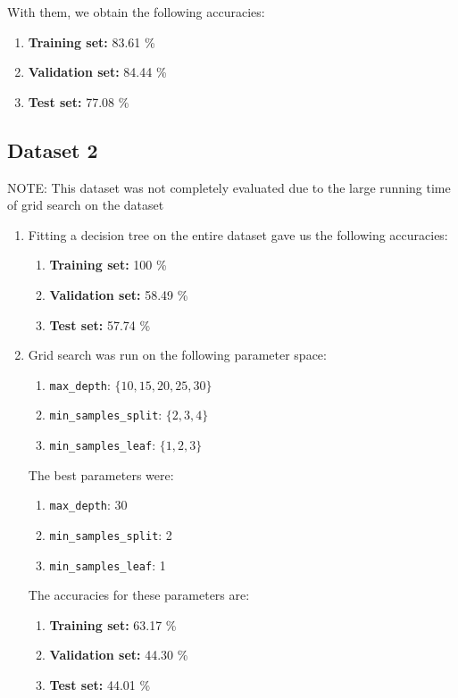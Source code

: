 \documentclass[12pt]{article}
\begin{document}
\begin{enumerate}[label=(\alph*)]
    With them, we obtain the following accuracies:
    \begin{enumerate}[label=(\roman*)]
        \item \textbf{Training set:} 83.61 \%
        \item \textbf{Validation set:} 84.44 \%
        \item \textbf{Test set:} 77.08 \%
    \end{enumerate}
\end{enumerate}

\subsection{Dataset 2}

NOTE: This dataset was not completely evaluated due to the large running time 
of grid search on the dataset

\begin{enumerate}[label=(\alph*)]
    \item Fitting a decision tree on the entire dataset gave us the following 
        accuracies:
    \begin{enumerate}[label=(\roman*)]
        \item \textbf{Training set:} 100 \%
        \item \textbf{Validation set:} 58.49 \%
        \item \textbf{Test set:} 57.74 \%
    \end{enumerate}

    \item Grid search was run on the following parameter space:
    \begin{enumerate}[label=(\roman*)]
        \item \texttt{max\_depth}: $\{10, 15, 20, 25, 30\}$
        \item \texttt{min\_samples\_split}: $\{2,3,4\}$
        \item \texttt{min\_samples\_leaf}: $\{1,2,3\}$
    \end{enumerate}

    The best parameters were:
    \begin{enumerate}[label=(\roman*)]
        \item \texttt{max\_depth}: 30
        \item \texttt{min\_samples\_split}: 2
        \item \texttt{min\_samples\_leaf}: 1
    \end{enumerate}

    The accuracies for these parameters are:
    \begin{enumerate}[label=(\roman*)]
        \item \textbf{Training set:} 63.17 \%
        \item \textbf{Validation set:} 44.30 \%
        \item \textbf{Test set:} 44.01 \%
    \end{enumerate}

\end{enumerate}
\end{document}
